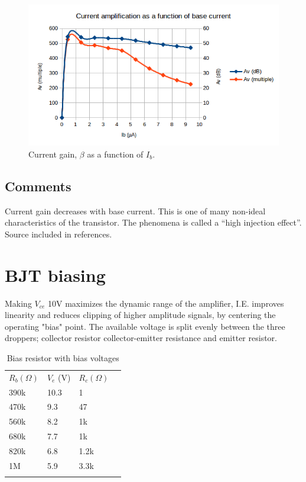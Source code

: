 \documentclass[11pt,a4paper]{article}
\begin{document}
\begin{figure}[htbp]
    \centering
    \includegraphics[width=\textwidth]{img/ic-ib-amplification_plot.png}
    \caption{Current gain, $\beta$ as a function of $I_{b}$.}
    \label{fig:ic-ib-amplification_plot}
\end{figure}


\subsection{Comments}\label{comments}

Current gain decreases with base current. This is one of many non-ideal
characteristics of the transistor. The phenomena is called a ``high
injection effect''. Source included in references.


\section{BJT biasing}\label{bjt-biasing}

Making $V_{ce}$ 10V maximizes the dynamic range of the amplifier, I.E. improves
linearity and reduces clipping of higher amplitude signals, by centering the
operating "bias" point. The available voltage is split evenly between the three
droppers; collector resistor collector-emitter resistance and emitter resistor.

\begin{longtable}[c]{@{}llll@{}}
\toprule\addlinespace
$R_{b} (\Omega)$ & $V_{e}$ (V) & $R_{c} (\Omega)$
\\\addlinespace
\midrule\endhead
390k & 10.3 & 1
\\\addlinespace
470k & 9.3 & 47
\\\addlinespace
560k & 8.2 & 1k
\\\addlinespace
680k & 7.7 & 1k
\\\addlinespace
820k & 6.8 & 1.2k
\\\addlinespace
1M & 5.9 & 3.3k
\\\addlinespace
\bottomrule
\addlinespace
\caption{Bias resistor with bias voltages}
\end{longtable}
\end{document}
